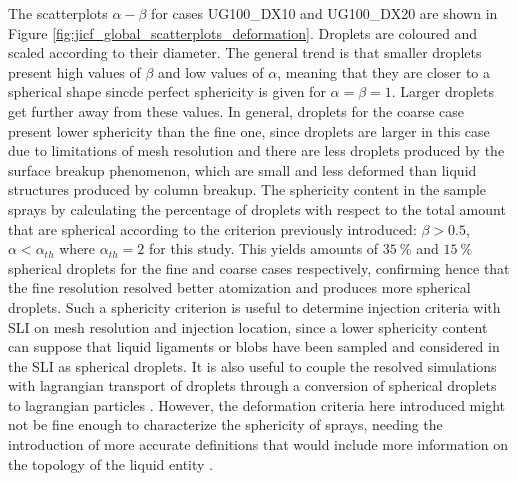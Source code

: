 The scatterplots $\alpha - \beta$ for cases UG100\_DX10 and UG100\_DX20 are shown in Figure \ref{fig:jicf_global_scatterplots_deformation}. Droplets are coloured and scaled according to their diameter. The general trend is that smaller droplets present high values of $\beta$ and low values of $\alpha$, meaning that they are closer to a spherical shape sincde perfect sphericity is given for $\alpha = \beta= 1$. Larger droplets get further away from these values. In general, droplets for the coarse case present lower sphericity than the fine one, since droplets are larger in this case due to limitations of mesh resolution and there are less droplets produced by the surface breakup phenomenon, which are small and less deformed than liquid structures produced by column breakup. The sphericity content in the sample sprays by calculating the percentage of droplets with respect to the total amount that are spherical according to the criterion previously introduced: $\beta > 0.5$, $\alpha < \alpha_{th}$ where $\alpha_{th} = 2$ for this study. This yields amounts of $35~\%$ and $15~\%$ spherical droplets for the fine and coarse cases respectively, confirming hence that the fine resolution resolved better atomization and produces more spherical droplets. Such a sphericity criterion is useful to determine injection criteria with SLI on mesh resolution and injection location, since a lower sphericity content can suppose that liquid ligaments or blobs have been sampled and considered in the SLI as spherical droplets. It is also useful to couple the resolved simulations with lagrangian transport of droplets through a conversion of spherical droplets to lagrangian particles . However, the deformation criteria here introduced might not be fine enough to characterize the sphericity of sprays, needing the introduction of more accurate definitions that would include more information on the topology of the liquid entity . 

